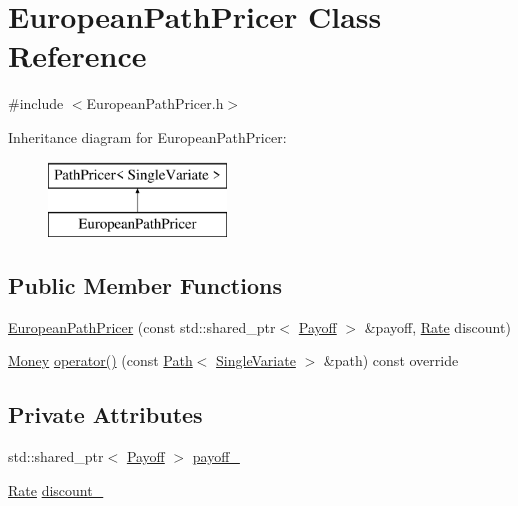 \hypertarget{class_european_path_pricer}{}\section{European\+Path\+Pricer Class Reference}
\label{class_european_path_pricer}


{\ttfamily \#include $<$European\+Path\+Pricer.\+h$>$}

Inheritance diagram for European\+Path\+Pricer\+:\begin{figure}[H]
\begin{center}
\leavevmode
\includegraphics[height=2.000000cm]{class_european_path_pricer}
\end{center}
\end{figure}
\subsection*{Public Member Functions}
\begin{DoxyCompactItemize}
\item 
\hyperlink{class_european_path_pricer_aa571bb1652a0d7e4f97d3d58e7c8b295}{European\+Path\+Pricer} (const std\+::shared\+\_\+ptr$<$ \hyperlink{class_payoff}{Payoff} $>$ \&payoff, \hyperlink{_name_def_8h_a25bee43a162de339c81f3d1caf6b887d}{Rate} discount)
\item 
\hyperlink{_name_def_8h_a5a9d48c16a694e9a2d9f1eca730dc8c5}{Money} \hyperlink{class_european_path_pricer_a879d161eeff532f1f3e2fc5224b3361b}{operator()} (const \hyperlink{class_path}{Path}$<$ \hyperlink{struct_single_variate}{Single\+Variate} $>$ \&path) const override
\end{DoxyCompactItemize}
\subsection*{Private Attributes}
\begin{DoxyCompactItemize}
\item 
std\+::shared\+\_\+ptr$<$ \hyperlink{class_payoff}{Payoff} $>$ \hyperlink{class_european_path_pricer_a2023ec56bae32c6db123e8d400d2b0cf}{payoff\+\_\+}
\item 
\hyperlink{_name_def_8h_a25bee43a162de339c81f3d1caf6b887d}{Rate} \hyperlink{class_european_path_pricer_a1bb1874fe4f263bff17a998f0ec9588c}{discount\+\_\+}
\end{DoxyCompactItemize}


